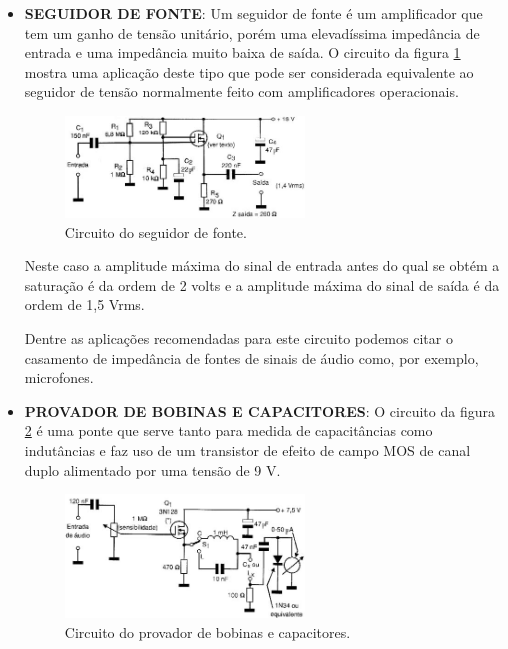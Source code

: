 \documentclass[12pt]{article}
\begin{document}
\begin{itemize}
                \item \textbf{SEGUIDOR DE FONTE}: Um seguidor de fonte é um amplificador que tem um ganho de tensão unitário, porém uma elevadíssima impedância de entrada e uma impedância muito baixa de saída. O circuito da figura \ref{fig:seguidor} mostra uma aplicação deste tipo que pode ser considerada equivalente ao seguidor de tensão normalmente feito com amplificadores operacionais.

                    \begin{figure}[htpb!]

                        \centering
                        \includegraphics[width=0.6\textwidth]{./images/Seguidor de fonte.jpg}
                        \caption{Circuito do seguidor de fonte.}
                        \label{fig:seguidor}

                    \end{figure}

                Neste caso a amplitude máxima do sinal de entrada antes do qual se obtém a saturação é da ordem de 2 volts e a amplitude máxima do sinal de saída é da ordem de 1,5 Vrms.

                Dentre as aplicações recomendadas para este circuito podemos citar o casamento de impedância de fontes de sinais de áudio como, por exemplo, microfones.

                \item \textbf{PROVADOR DE BOBINAS E CAPACITORES}: O circuito da figura \ref{fig:provador} é uma ponte que serve tanto para medida de capacitâncias como indutâncias e faz uso de um transistor de efeito de campo MOS de canal duplo alimentado por uma tensão de 9 V.

                    \begin{figure}[htpb!]

                        \centering
                        \includegraphics[width=0.6\textwidth]{./images/Provador de bobinas e capacitores.jpg}
                        \caption{Circuito do provador de bobinas e capacitores.}
                        \label{fig:provador}


\end{figure}
\end{itemize}
\end{document}
